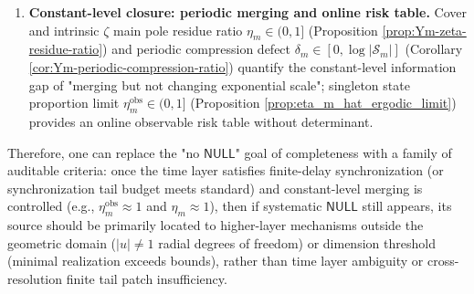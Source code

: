 \begin{remark}
\begin{enumerate}
  \item \textbf{Constant-level closure: periodic merging and online risk table.} Cover and intrinsic \(\zeta\) main pole residue ratio \(\eta_m\in(0,1]\) (Proposition \ref{prop:Ym-zeta-residue-ratio}) and periodic compression defect \(\delta_m\in[0,\log|\mathcal{S}_m|]\) (Corollary \ref{cor:Ym-periodic-compression-ratio}) quantify the constant-level information gap of "merging but not changing exponential scale"; singleton state proportion limit \(\eta_m^{\mathrm{obs}}\in(0,1]\) (Proposition \ref{prop:eta_m_hat_ergodic_limit}) provides an online observable risk table without determinant.
\end{enumerate}
\par
Therefore, one can replace the "no \(\mathsf{NULL}\)" goal of completeness with a family of auditable criteria: once the time layer satisfies finite-delay synchronization (or synchronization tail budget meets standard) and constant-level merging is controlled (e.g., \(\eta_m^{\mathrm{obs}}\approx 1\) and \(\eta_m\approx 1\)), then if systematic \(\mathsf{NULL}\) still appears, its source should be primarily located to higher-layer mechanisms outside the geometric domain (\(|u|\neq 1\) radial degrees of freedom) or dimension threshold (minimal realization exceeds bounds), rather than time layer ambiguity or cross-resolution finite tail patch insufficiency.
\end{remark}

